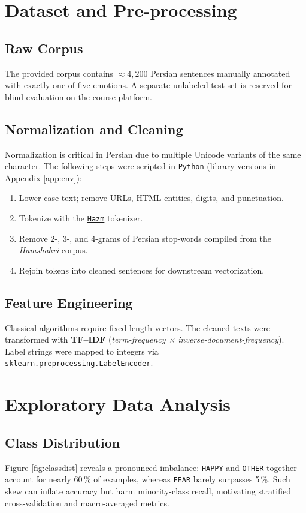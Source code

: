 \documentclass[12pt]{article}
\begin{document}
\section{Dataset and Pre-processing}
\label{sec:data}
\subsection{Raw Corpus}
The provided corpus contains $\approx4,200$ Persian sentences manually annotated with exactly one of five emotions.
A separate unlabeled test set is reserved for blind evaluation on the course platform.

\subsection{Normalization and Cleaning}
Normalization is critical in Persian due to multiple Unicode variants of the same character.
The following steps were scripted in \texttt{Python} (library versions in Appendix \ref{app:env}):
\begin{enumerate}[label=(\arabic*)]
  \item Lower-case text; remove URLs, HTML entities, digits, and punctuation.
  \item Tokenize with the \href{https://github.com/sobhe/hazm}{\texttt{Hazm}} tokenizer.
  \item Remove 2-, 3-, and 4-grams of Persian stop-words compiled from the \textit{Hamshahri} corpus.
  \item Rejoin tokens into cleaned sentences for downstream vectorization.
\end{enumerate}

\subsection{Feature Engineering}
Classical algorithms require fixed-length vectors.  
The cleaned texts were transformed with \textbf{TF–IDF} (\textit{term-frequency × inverse-document-frequency}).
Label strings were mapped to integers via \texttt{sklearn.preprocessing.LabelEncoder}.

\section{Exploratory Data Analysis}
\label{sec:eda}

\subsection{Class Distribution}
Figure \ref{fig:classdist} reveals a pronounced imbalance: \texttt{HAPPY} and \texttt{OTHER} together
account for nearly 60\,\% of examples, whereas \texttt{FEAR} barely surpasses 5\,\%.
Such skew can inflate accuracy but harm minority-class recall, motivating stratified cross-validation
and macro-averaged metrics.
\end{document}
